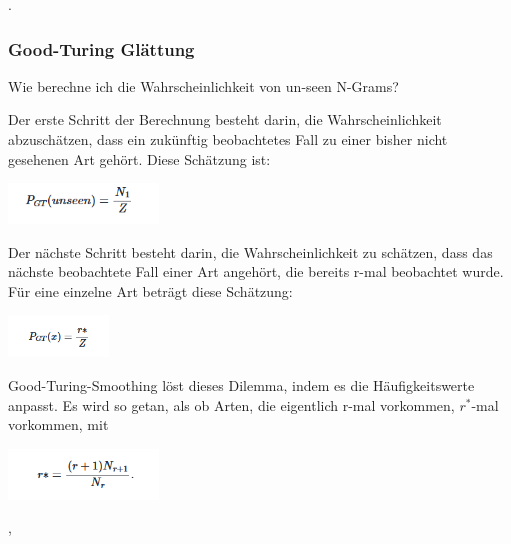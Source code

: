 \documentclass[12pt]{article}
\begin{document}
\cite{jurafsky2023}.

\subsubsection{Good-Turing Glättung}
Wie berechne ich die Wahrscheinlichkeit von un-seen N-Grams?

Der erste Schritt der Berechnung besteht darin, die Wahrscheinlichkeit abzuschätzen, dass ein zukünftig beobachtetes Fall zu einer bisher nicht gesehenen Art gehört. Diese Schätzung ist:
\begin{center}
	\includegraphics[width=0.3\textwidth]{statics/Borisov/5.PNG}
\end{center}

Der nächste Schritt besteht darin, die Wahrscheinlichkeit zu schätzen, dass das nächste beobachtete Fall einer Art angehört, die bereits r-mal beobachtet wurde. Für eine einzelne Art beträgt diese Schätzung:
\begin{center}
	\includegraphics[width=0.2\textwidth]{statics/Borisov/6.PNG}
\end{center}
Good-Turing-Smoothing löst dieses Dilemma, indem es die Häufigkeitswerte anpasst. Es wird so getan, als ob Arten, die eigentlich r-mal vorkommen, \( r^* \)-mal vorkommen, mit
\begin{center}
	\includegraphics[width=0.3\textwidth]{statics/Borisov/7.PNG}
\end{center}
\cite{maucher2022},\cite{gale1995}
\end{document}

